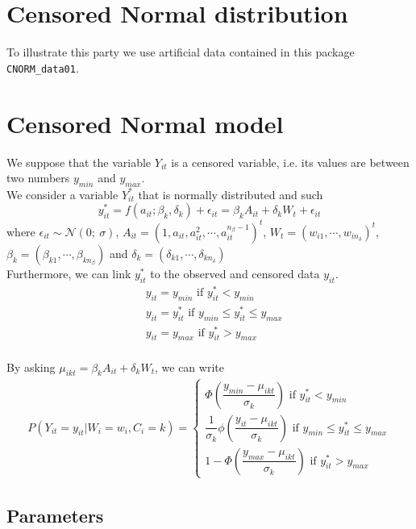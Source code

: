 \documentclass{article}\usepackage[]{graphicx}\usepackage[]{color}
\begin{document}
\section{Censored Normal distribution}

To illustrate this party we use artificial data contained in this package \verb|CNORM_data01|.

\section{Censored Normal model}
We suppose that the variable $Y_{it}$ is a censored variable, i.e. its values are between two numbers $y_{min}$ and $y_{max}$.\\
We consider a variable $Y^*_{it}$ that is normally distributed and such
\begin{equation}
y^*_{it} = f(a_{it}; \beta_k, \delta_k)+\epsilon_{it} =\beta_k A_{it}+\delta_k W_t+\epsilon_{it}
\end{equation}
where $\epsilon_{it}\sim \mathcal{N}\left(0;\ \sigma\right)$,  $A_{it}=(1,a_{it},a_{it}^2,\cdots,a_{it}^{n_\beta-1})^t $, $W_t=(w_{i1},\cdots,w_{in_\delta})^t $, $\beta_k =(\beta_{k1},\cdots, \beta_{kn_\beta})$ and $\delta_k=(\delta_{k1},\cdots,\delta_{kn_\delta}) $\\
Furthermore, we can link $y^*_{it}$ to the observed and censored data $y_{it}$.
\begin{align}
& y_{it}= y_{min} \text{ if } y^*_{it}< y_{min}\\
& y_{it}= y^*_{it} \text{ if } y_{min}\leq y^*_{it}\leq y_{max}\\
&y_{it}= y_{max} \text{ if } y^*_{it}> y_{max}\\
\end{align}

By asking $\mu_{ikt}=\beta_k A_{it}+\delta_k W_t$,  we can write
\begin{align}
P(Y_{it}=y_{it}|W_i=w_i,C_i=k)=\left\lbrace
\begin{array}{l}
\Phi\left(\dfrac{y_{min}-\mu_{ikt}}{\sigma_k}\right) \text{ if } y^*_{it}< y_{min}\\
\dfrac{1}{\sigma_k}\phi\left(\dfrac{y_{it}-\mu_{ikt}}{\sigma_k}\right)\text{ if } y_{min}\leq y^*_{it}\leq y_{max}\\
1-\Phi\left(\dfrac{y_{max}-\mu_{ikt}}{\sigma_k}\right) \text{ if } y^*_{it}> y_{max}
\end{array}\right.
\end{align}

\subsection{Parameters}
\end{document}
